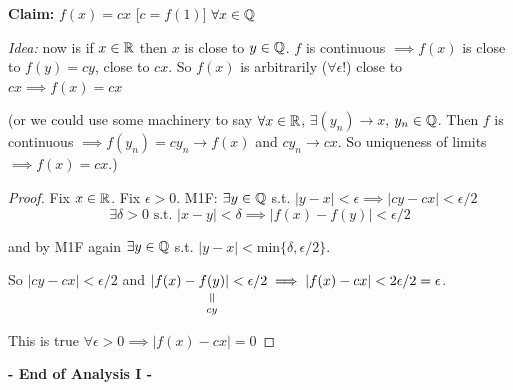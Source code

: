 \textbf{Claim:} $f(x) = cx$ [$c = f(1)$] $\forall x \in\mathbb{Q}$

\emph{Idea:} now is if $x \in\mathbb{R}$ then $x$ is close to $y \in\mathbb{Q}$. $f$ is continuous $\implies f(x)$ is close to $f(y) = cy$, close to $cx$. So $f(x)$ is arbitrarily ($\forall \epsilon!$) close to $cx \implies f(x) = cx$

(or we could use some machinery to say $\forall x \in\mathbb{R}$, $\exists (y_n) \to x$, $y_n \in\mathbb{Q}$. Then $f$ is continuous $\implies f(y_n) = cy_n \to f(x)$ and $cy_n \to cx$. So uniqueness of limits $\implies f(x) = cx$.) 

\begin{proof}
Fix $x \in\mathbb{R}$. Fix $\epsilon >0$. M1F: $\exists y \in\mathbb{Q}$ s.t. $|y-x| < \epsilon \implies |cy - cx| < \epsilon/2$
\[\exists \delta >0\text{ s.t. }|x-y| < \delta \implies |f(x) - f(y)| < \epsilon/2\]

and by M1F again $\exists y\in\mathbb{Q}$ s.t. $|y-x| < \mathrm{min}\{\delta,\epsilon/2\}$. 

So $|cy-cx|< \epsilon/2$ and $|f(x) - \equalto{f(y)}{cy}| < \epsilon/2 \implies |f(x) - cx| < 2\epsilon/2 = \epsilon$. 

This is true $\forall \epsilon >0 \implies |f(x) -cx| = 0$
\end{proof}



  \begin{center}
  \textsf{\textbf{- End of Analysis I -}}	
  \end{center}
  
\setcounter{lecture}{1}

  
